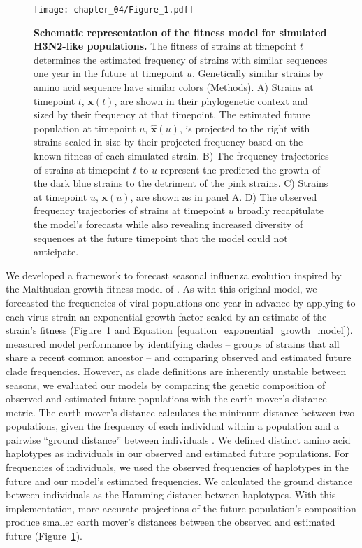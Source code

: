 \begin{figure}
  \begin{center}
  \texttt{[image: chapter\_04/Figure\_1.pdf]}
  \caption[{Schematic representation of the fitness model for simulated H3N2-like populations.}]{
    {\bf Schematic representation of the fitness model for simulated H3N2-like populations.}
    The fitness of strains at timepoint $t$ determines the estimated frequency of strains with similar sequences one year in the future at timepoint $u$.
    Genetically similar strains by amino acid sequence have similar colors (Methods).
    A) Strains at timepoint $t$, $\mathbf{x}(t)$, are shown in their phylogenetic context and sized by their frequency at that timepoint.
    The estimated future population at timepoint $u$, $\mathbf{\hat{x}}(u)$, is projected to the right with strains scaled in size by their projected frequency based on the known fitness of each simulated strain.
    B) The frequency trajectories of strains at timepoint $t$ to $u$ represent the predicted the growth of the dark blue strains to the detriment of the pink strains.
    C) Strains at timepoint $u$, $\mathbf{x}(u)$, are shown as in panel A.
    D) The observed frequency trajectories of strains at timepoint $u$ broadly recapitulate the model's forecasts while also revealing increased diversity of sequences at the future timepoint that the model could not anticipate.
  }
  \label{fig:model}
  \end{center}
\end{figure}

We developed a framework to forecast seasonal influenza evolution inspired by the Malthusian growth fitness model of \cite{Luksza:2014hj}.
As with this original model, we forecasted the frequencies of viral populations one year in advance by applying to each virus strain an exponential growth factor scaled by an estimate of the strain's fitness (Figure~\ref{fig:model} and Equation~\ref{equation_exponential_growth_model}).
\cite{Luksza:2014hj} measured model performance by identifying clades -- groups of strains that all share a recent common ancestor -- and comparing observed and estimated future clade frequencies.
However, as clade definitions are inherently unstable between seasons, we evaluated our models by comparing the genetic composition of observed and estimated future populations with the earth mover's distance metric.
The earth mover's distance calculates the minimum distance between two populations, given the frequency of each individual within a population and a pairwise ``ground distance'' between individuals \citep{Rubner1998}.
We defined distinct amino acid haplotypes as individuals in our observed and estimated future populations.
For frequencies of individuals, we used the observed frequencies of haplotypes in the future and our model's estimated frequencies.
We calculated the ground distance between individuals as the Hamming distance between haplotypes.
With this implementation, more accurate projections of the future population's composition produce smaller earth mover's distances between the observed and estimated future (Figure~\ref{fig:model}).

